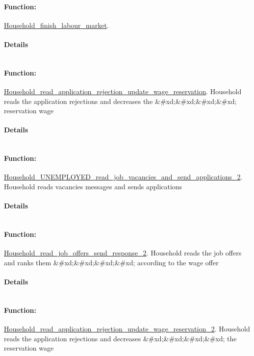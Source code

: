 \documentclass[a4paper,11pt]{article}
\begin{document}
\paragraph{Function:}\url{Household_finish_labour_market}.

\paragraph{Details}
\begin{verbatim}
\end{verbatim}
\paragraph{Function:}\url{Household_read_application_rejection_update_wage_reservation}.
Household reads the application rejections and decreases the \&\#xd;\&\#xd;\&\#xd;\&\#xd;
reservation wage
\paragraph{Details}
\begin{verbatim}
\end{verbatim}
\paragraph{Function:}\url{Household_UNEMPLOYED_read_job_vacancies_and_send_applications_2}.
Household reads vacancies messages and sends applications
\paragraph{Details}
\begin{verbatim}
\end{verbatim}
\paragraph{Function:}\url{Household_read_job_offers_send_response_2}.
Household reads the job offers and ranks them \&\#xd;\&\#xd;\&\#xd;\&\#xd;
according to the wage offer
\paragraph{Details}
\begin{verbatim}
\end{verbatim}
\paragraph{Function:}\url{Household_read_application_rejection_update_wage_reservation_2}.
Household reads the application rejections and decreases \&\#xd;\&\#xd;\&\#xd;\&\#xd;
the reservation wage
\end{document}

